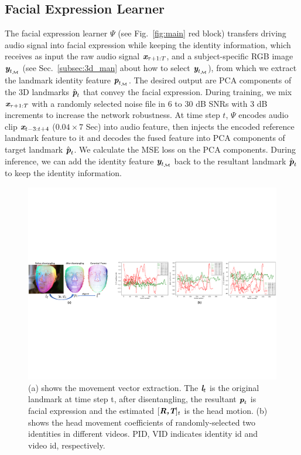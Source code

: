 \documentclass[runningheads]{llncs}
\def\mathbi#1{\textbf{\em #1}}
\begin{document}
\subsection{Facial Expression Learner}
\label{subsec:facial_exp}
The facial expression learner $\Psi$ (see Fig.~\ref{fig:main} red block) transfers driving audio signal into facial expression while keeping the identity information, which receives as input the raw audio signal $\mathbi{x}_{\tau +1:T}$, and a subject-specific RGB image $\mathbi{y}_{t_{\mathcal{M}}}$ (see Sec.~\ref{subsec:3d_man} about how to select $\mathbi{y}_{t_{\mathcal{M}}}$), from which we extract the landmark identity feature $\mathbi{p}_{t_{\mathcal{M}}}$. The desired output are PCA components of the 3D landmarks ${\hat{\mathbi{p}}}_{t}$ that convey the facial expression. During training, we mix $\mathbi{x}_{\tau +1:T}$ with a randomly selected noise file in 6 to 30 dB SNRs with 3 dB increments to increase the network robustness. At time step $t$, $\Psi$ encodes audio clip $\mathbi{x}_{t-3:t+4}$ ($0.04 \times 7$ Sec) into audio feature, then injects the encoded reference landmark feature to it and decodes the fused feature into PCA components of target landmark ${\hat{\mathbi{p}}}_{t}$. We calculate the MSE loss on the PCA components. During inference, we can add the identity feature  $\mathbi{y}_{t_{\mathcal{M}}}$ back to the resultant landmark ${\hat{\mathbi{p}}}_{t}$ to keep the identity information. 
\begin{figure}[t]
\includegraphics[width= \linewidth]{latex/images/RT_reduce.pdf}
\caption{ (a) shows the movement vector extraction. The $\mathbi{l}_t$ is the original landmark at time step t, after disentangling, the resultant $\mathbi{p}_t$ is facial expression and the estimated $[\mathbi{R,T}]_t$ is the head motion. (b) shows the head movement coefficients of randomly-selected two identities in different videos. PID, VID indicates identity id and video id, respectively. }
\label{fig:rt_compute}
\end{figure}
\end{document}
